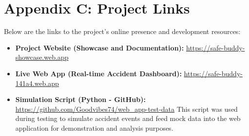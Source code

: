 \documentclass[12pt]{article}
\begin{document}
\section*{Appendix C: Project Links}

Below are the links to the project’s online presence and development resources:

\begin{itemize}
  \item \textbf{Project Website (Showcase and Documentation):} \href{https://safe-buddy-showcase.web.app}{https://safe-buddy-showcase.web.app}
  \item \textbf{Live Web App (Real-time Accident Dashboard):} \href{https://safe-buddy-141a4.web.app}{https://safe-buddy-141a4.web.app}
  \item \textbf{Simulation Script (Python - GitHub):} \href{https://github.com/Goodvibes74/web_app-test-data}{https://github.com/Goodvibes74/web_app-test-data}  
  This script was used during testing to simulate accident events and feed mock data into the web application for demonstration and analysis purposes.
\end{itemize}
\end{document}
